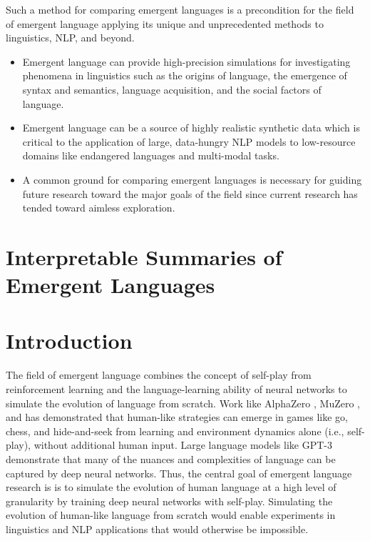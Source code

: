 \noindent
Such a method for comparing emergent languages is a precondition for the field of emergent language applying its unique and unprecedented methods to linguistics, NLP, and beyond.
\begin{itemize}
    \item Emergent language can provide high-precision simulations for investigating phenomena in linguistics such as the origins of language, the emergence of syntax and semantics, language acquisition, and the social factors of language.
    \item Emergent language can be a source of highly realistic synthetic data
        which is critical to the application of large, data-hungry NLP models to low-resource domains like endangered languages and multi-modal tasks.
    \item A common ground for comparing emergent languages is necessary for guiding future research toward the major goals of the field since current research has tended toward aimless exploration.
\end{itemize}

\newpage


\section*{Interpretable Summaries of Emergent Languages}

\section{Introduction}

The field of emergent language combines the concept of self-play from reinforcement learning and the language-learning ability of neural networks to simulate the evolution of language from scratch.
Work like AlphaZero \citep{silver2017mastering}, MuZero \citep{schrittwiser2020mastering}, and \citet{Baker2020Emergent} has demonstrated that human-like strategies can emerge in games like go, chess, and hide-and-seek from learning and environment dynamics alone (i.e., self-play), without additional human input.
Large language models like GPT-3 \citep{brown2020language} demonstrate that many of the nuances and complexities of language can be captured by deep neural networks.
Thus, the central goal of emergent language research is is to simulate the evolution of human language at a high level of granularity by training deep neural networks with self-play.
Simulating the evolution of human-like language from scratch would enable experiments in linguistics and NLP applications that would otherwise be impossible.

